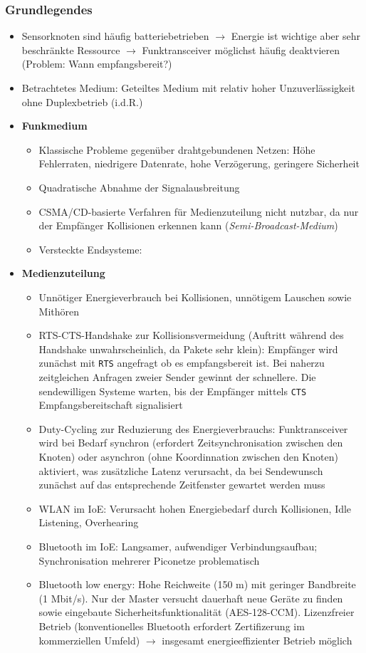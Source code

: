 \subsubsection{Grundlegendes}
\begin{itemize}
	\item Sensorknoten sind häufig batteriebetrieben \(\rightarrow\) Energie ist wichtige aber sehr beschränkte Ressource \(\rightarrow\) Funktransceiver möglichst häufig deaktvieren (Problem: Wann empfangsbereit?)
	\item Betrachtetes Medium: Geteiltes Medium mit relativ hoher Unzuverlässigkeit ohne Duplexbetrieb (i.d.R.)
	\item \textbf{Funkmedium}
	\begin{itemize}
		\item Klassische Probleme gegenüber drahtgebundenen Netzen: Höhe Fehlerraten, niedrigere Datenrate, hohe Verzögerung, geringere Sicherheit
		\item Quadratische Abnahme der Signalausbreitung
		\item CSMA/CD-basierte Verfahren für Medienzuteilung nicht nutzbar, da nur der Empfänger Kollisionen erkennen kann (\textit{Semi-Broadcast-Medium})
		\item Versteckte Endsysteme: 
	\end{itemize}
	\item \textbf{Medienzuteilung}
	\begin{itemize}
		\item Unnötiger Energieverbrauch bei Kollisionen, unnötigem Lauschen sowie Mithören
		\item RTS-CTS-Handshake zur Kollisionsvermeidung (Auftritt während des Handshake unwahrscheinlich, da Pakete sehr klein): Empfänger wird zunächst mit \texttt{RTS} angefragt ob es empfangsbereit ist. Bei naherzu zeitgleichen Anfragen zweier Sender gewinnt der schnellere. Die sendewilligen Systeme warten, bis der Empfänger mittels \texttt{CTS} Empfangsbereitschaft signalisiert
		\item Duty-Cycling zur Reduzierung des Energieverbrauchs: Funktransceiver wird bei Bedarf synchron (erfordert Zeitsynchronisation zwischen den Knoten) oder asynchron (ohne Koordinnation zwischen den Knoten) aktiviert, was zusätzliche Latenz verursacht, da bei Sendewunsch zunächst auf das entsprechende Zeitfenster gewartet werden muss
		\item WLAN im IoE: Verursacht hohen Energiebedarf durch Kollisionen, Idle Listening, Overhearing
		\item Bluetooth im IoE: Langsamer, aufwendiger Verbindungsaufbau; Synchronisation mehrerer Piconetze problematisch
		\item Bluetooth low energy: Hohe Reichweite (150 m) mit geringer Bandbreite (1 Mbit/s). Nur der Master versucht dauerhaft neue Geräte zu finden sowie eingebaute Sicherheitsfunktionalität (AES-128-CCM). Lizenzfreier Betrieb (konventionelles Bluetooth erfordert Zertifizerung im kommerziellen Umfeld) \(\rightarrow\) insgesamt energieeffizienter Betrieb möglich
	\end{itemize}
\end{itemize}

